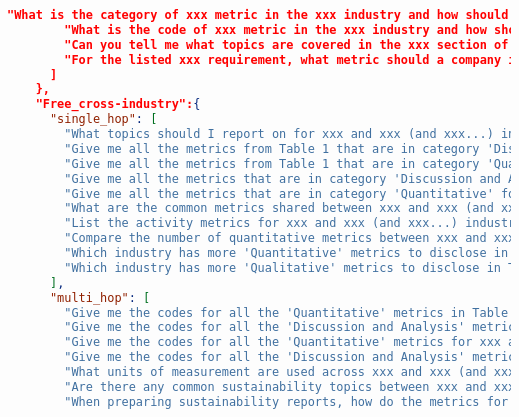 \begin{appendices}
\begin{lstlisting}[language=json,firstnumber=1,label={lst:qa_structures},caption={User-representative sample questions for `CoT + Few-shot' question generation}]
        "What is the category of xxx metric in the xxx industry and how should this metric be disclosed?",
        "What is the code of xxx metric in the xxx industry and how should this metric be disclosed??",
        "Can you tell me what topics are covered in the xxx section of the xxx document and what are the key takeaways I need to know as a company writiny my sustainability report in the xxx industry?",
        "For the listed xxx requirement, what metric should a company in the xxx industry use for xxx and how should this metric be calculated?"
      ]
    },
    "Free_cross-industry":{
      "single_hop": [
        "What topics should I report on for xxx and xxx (and xxx...) industries?",
        "Give me all the metrics from Table 1 that are in category 'Discussion and Analysis' for xxx and xxx (and xxx...) industries.",
        "Give me all the metrics from Table 1 that are in category 'Quantitative' for xxx and xxx (and xxx...) industries.",
        "Give me all the metrics that are in category 'Discussion and Analysis' for xxx and xxx (and xxx...) industries.",
        "Give me all the metrics that are in category 'Quantitative' for xxx and xxx (and xxx...) industries.",
        "What are the common metrics shared between xxx and xxx (and xxx...) industries, if any?",
        "List the activity metrics for xxx and xxx (and xxx...) industries.",
        "Compare the number of quantitative metrics between xxx and xxx (and xxx...) industries.",
        "Which industry has more 'Quantitative' metrics to disclose in Table 1 between xxx and xxx (and xxx) industries?",
        "Which industry has more 'Qualitative' metrics to disclose in Table 1 between xxx and xxx (and xxx) industries?"
      ],
      "multi_hop": [
        "Give me the codes for all the 'Quantitative' metrics in Table 1 for xxx and xxx (and xxx...) industries.",
        "Give me the codes for all the 'Discussion and Analysis' metrics in Table 1 for xxx and xxx (and xxx...) industries.",
        "Give me the codes for all the 'Quantitative' metrics for xxx and xxx (and xxx...) industries.",
        "Give me the codes for all the 'Discussion and Analysis' metrics for xxx and xxx (and xxx...) industries.",
        "What units of measurement are used across xxx and xxx (and xxx...) industries for measuring xxx?",
        "Are there any common sustainability topics between xxx and xxx (and xxx...) industries? If so, how do their reporting requirements differ?",
        "When preparing sustainability reports, how do the metrics for measuring xxx differ between the xxx and xxx (and xxx...) industries?",

\end{lstlisting}
\end{appendices}
